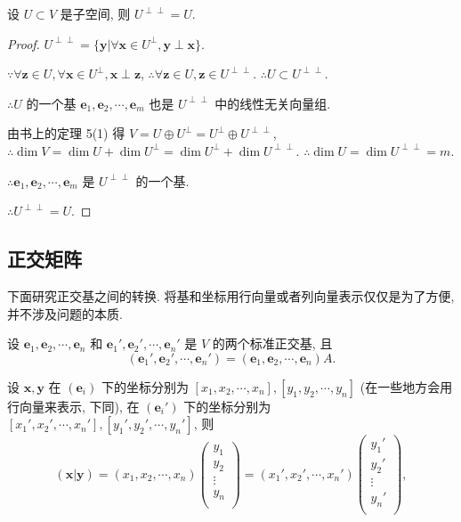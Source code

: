 \documentclass[color=black,device=normal,lang=cn,mode=geye]{elegantnote}
\begin{document}
\begin{theorem}[书上的定理 5(2)]
    设 $U\subset V$ 是子空间, 则 $U^{\perp\perp}=U$.
\end{theorem}
\begin{proof}
    $U^{\perp\perp}=\{\boldsymbol{y}|\forall\boldsymbol{x}\in U^\perp,\boldsymbol{y}\perp\boldsymbol{x}\}$.
    
    $\because\forall\boldsymbol{z}\in U,\forall\boldsymbol{x}\in U^\perp,\boldsymbol{x}\perp\boldsymbol{z}$, $\therefore\forall\boldsymbol{z}\in U,\boldsymbol{z}\in U^{\perp\perp}$. $\therefore U\subset U^{\perp\perp}$.

    $\therefore U$ 的一个基 $\boldsymbol{e}_1,\boldsymbol{e}_2,\cdots,\boldsymbol{e}_m$ 也是 $U^{\perp\perp}$ 中的线性无关向量组.

    由书上的定理 5(1) 得 $V=U\oplus U^\perp=U^\perp\oplus U^{\perp\perp}$, $\therefore\dim V=\dim U+\dim U^\perp=\dim U^\perp+\dim U^{\perp\perp}$. $\therefore\dim U=\dim U^{\perp\perp}=m$.

    $\therefore\boldsymbol{e}_1,\boldsymbol{e}_2,\cdots,\boldsymbol{e}_m$ 是 $U^{\perp\perp}$ 的一个基.

    $\therefore U^{\perp\perp}=U$.
\end{proof}
\subsection{正交矩阵}
下面研究正交基之间的转换. 将基和坐标用行向量或者列向量表示仅仅是为了方便, 并不涉及问题的本质.

设 $\boldsymbol{e}_1,\boldsymbol{e}_2,\cdots,\boldsymbol{e}_n$ 和 $\boldsymbol{e}_1',\boldsymbol{e}_2',\cdots,\boldsymbol{e}_n'$ 是 $V$ 的两个标准正交基, 且
\[(\boldsymbol{e}_1',\boldsymbol{e}_2',\cdots,\boldsymbol{e}_n')=(\boldsymbol{e}_1,\boldsymbol{e}_2,\cdots,\boldsymbol{e}_n)A.\]

设 $\boldsymbol{x},\boldsymbol{y}$ 在 $(\boldsymbol{e}_i)$ 下的坐标分别为 $[x_1,x_2,\cdots,x_n],[y_1,y_2,\cdots,y_n]$ (在一些地方会用行向量来表示, 下同), 在 $(\boldsymbol{e}_i')$ 下的坐标分别为 $[x_1',x_2',\cdots,x_n'],[y_1',y_2',\cdots,y_n']$, 则
\[(\boldsymbol{x}|\boldsymbol{y})=(x_1,x_2,\cdots,x_n)\begin{pmatrix}
    y_1 \\
    y_2 \\
    \vdots \\
    y_n \\
\end{pmatrix}=(x_1',x_2',\cdots,x_n')\begin{pmatrix}
    y_1' \\
    y_2' \\
    \vdots \\
    y_n' \\
\end{pmatrix},\]
\end{document}
